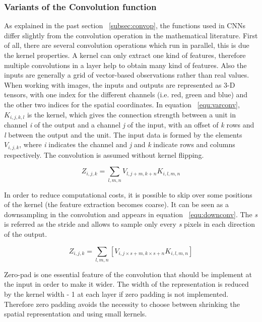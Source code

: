 \subsubsection{Variants of the Convolution function}
As explained in the past section ~\ref{subsec:convop}, the functions used in CNNs differ slightly from the convolution operation in the mathematical literature. 
First of all, there are several convolution operations which run in parallel, this is due the kernel properties. A kernel can only extract one kind of features, therefore multiple convolutions in a layer help to obtain many kind of features.
Also the inputs are generally a grid of vector-based observations rather than real values. When working with images, the inputs and outputs are represented as 3-D tensors, with one index for the different channels (i.e. red, green and blue) and the other two indices for the spatial coordinates.
In equation ~\ref{equ:varconv}, ${K_{i,j,k,l}}$ is the kernel, which gives the connection strength between a unit in channel \textit{i} of the output and a channel \textit{j} of the input, with an offset of \textit{k} rows and \textit{l} between the output and the unit. The input data is formed by the elements ${V_{i,j,k}}$, where \textit{i} indicates the channel and \textit{j} and \textit{k} indicate  rows and columns respectively. The convolution is assumed without kernel flipping. 

\begin{equation}
 {Z_{i,j,k}} = \sum_{l,m,n}{V_{l,j+m,k+n}}{K_{i,l,m,n}}
 \label{equ:varconv}
\end{equation}

In order to reduce computational costs, it is possible to skip over some positions of the kernel (the feature extraction becomes coarse). It can be seen as a downsampling in the convolution and appears in equation ~\ref{equ:downconv}. The \textit{s} is referred as the stride and allows to sample only every \textit{s} pixels in each direction of the output.

\begin{equation}
 {Z_{i,j,k}} = \sum_{l,m,n}[{V_{i,j \times s+m,k \times s+n}}{K_{i,l,m,n}}]
 \label{equ:downconv}
\end{equation}

Zero-pad is one essential feature of the convolution that should be implement at the input in order to make it wider. The width of the representation is reduced by the kernel width - 1 at each layer if zero padding is not implemented. Therefore zero padding avoids the necessity to choose between shrinking the spatial representation and using small kernels. 

